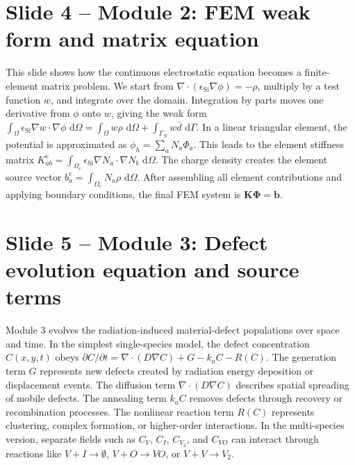 \documentclass[11pt]{article}
\newcommand{\dd}{\,\mathrm{d}}
\newcommand{\grad}{\nabla}
\newcommand{\divg}{\nabla\!\cdot}
\newcommand{\epsSi}{\epsilon_{\mathrm{Si}}}
\newcommand{\mat}[1]{\mathbf{#1}}
\newcommand{\vect}[1]{\bm{#1}}
\begin{document}
\section*{Slide 4 -- Module 2: FEM weak form and matrix equation}
\begin{scriptbox}
This slide shows how the continuous electrostatic equation becomes a finite-element matrix problem. We start from \(\divg(\epsSi\grad\phi)=-\rho\), multiply by a test function \(w\), and integrate over the domain. Integration by parts moves one derivative from \(\phi\) onto \(w\), giving the weak form \(\int_\Omega \epsSi\grad w\cdot\grad\phi\,\dd\Omega=\int_\Omega w\rho\,\dd\Omega+\int_{\Gamma_N}w\bar{d}\,\dd\Gamma\). In a linear triangular element, the potential is approximated as \(\phi_h=\sum_aN_a\Phi_a\). This leads to the element stiffness matrix \(K^e_{ab}=\int_{\Omega_e}\epsSi\grad N_a\cdot\grad N_b\,\dd\Omega\). The charge density creates the element source vector \(b^e_a=\int_{\Omega_e}N_a\rho\,\dd\Omega\). After assembling all element contributions and applying boundary conditions, the final FEM system is \(\mat{K}\vect{\Phi}=\vect{b}\).
\end{scriptbox}

\section*{Slide 5 -- Module 3: Defect evolution equation and source terms}
\begin{scriptbox}
Module 3 evolves the radiation-induced material-defect populations over space and time. In the simplest single-species model, the defect concentration \(C(x,y,t)\) obeys \(\partial C/\partial t=\divg(D\grad C)+G-k_aC-R(C)\). The generation term \(G\) represents new defects created by radiation energy deposition or displacement events. The diffusion term \(\divg(D\grad C)\) describes spatial spreading of mobile defects. The annealing term \(k_aC\) removes defects through recovery or recombination processes. The nonlinear reaction term \(R(C)\) represents clustering, complex formation, or higher-order interactions. In the multi-species version, separate fields such as \(C_V\), \(C_I\), \(C_{V_2}\), and \(C_{VO}\) can interact through reactions like \(V+I\rightarrow\emptyset\), \(V+O\rightarrow VO\), or \(V+V\rightarrow V_2\).
\end{scriptbox}
\end{document}
